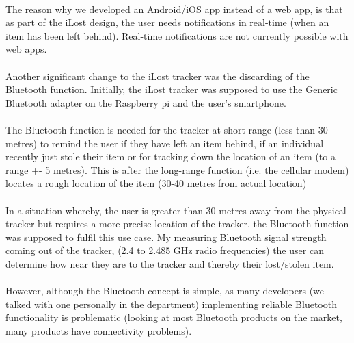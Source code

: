 \documentclass[12pt,a4paper]{article}
\begin{document}
        \paragraph{} The reason why we developed an Android/iOS app instead of a web app, is that as part of the iLost design, the user needs notifications in real-time (when an item has been left behind). Real-time notifications are not currently possible with web apps.
        
        \paragraph{} Another significant change to the iLost tracker was the discarding of the Bluetooth function. Initially, the iLost tracker was supposed to use the Generic Bluetooth adapter on the Raspberry pi and the user’s smartphone.  
        
        \paragraph{} The Bluetooth function is needed for the tracker at short range (less than 30 metres) to remind the user if they have left an item behind, if an individual recently just stole their item or for tracking down the location of an item (to a range +- 5 metres). This is after the long-range function (i.e. the cellular modem) locates a rough location of the item (30-40 metres from actual location)
        
        \paragraph{} In a situation whereby, the user is greater than 30 metres away from the physical tracker but requires a more precise location of the tracker, the Bluetooth function was supposed to fulfil this use case. My measuring Bluetooth signal strength coming out of the tracker, (2.4 to 2.485 GHz radio frequencies) the user can determine how near they are to the tracker and thereby their lost/stolen item. 
        
        \paragraph{} However, although the Bluetooth concept is simple, as many developers (we talked with one personally in the department) implementing reliable Bluetooth functionality is problematic (looking at most Bluetooth products on the market, many products have connectivity problems).  
        
\end{document}
